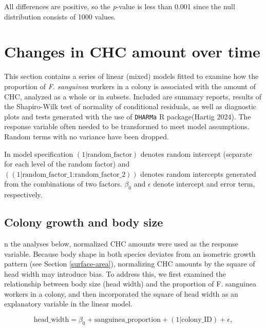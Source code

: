 \documentclass[
]{article}
\begin{document}
All differences are positive, so the \emph{p}-value is less than 0.001 since the null distribution consists of 1000 values.

\section{Changes in CHC amount over time}\label{changes-in-chc-amount-over-time}

This section contains a series of linear (mixed) models fitted to examine how the proportion of \emph{F. sanguinea} workers in a colony is associated with the amount of CHC, analyzed as a whole or in subsets. Included are summary reports, results of the Shapiro-Wilk test of normality of conditional residuals, as well as diagnostic plots and tests generated with the use of \texttt{DHARMa} R package(Hartig 2024). The response variable often needed to be transformed to meet model assumptions. Random terms with no variance have been dropped.

In model specification \((1|\text{random_factor})\) denotes random intercept (separate for each level of the random factor) and \(((1|\text{random_factor_1:random_factor_2}))\) denotes random intercepts generated from the combinations of two factors. \(\beta_{0}\) and \(\epsilon\) denote intercept and error term, respectively.

\subsection{Colony growth and body size}\label{colony-growth-and-body-size}

n the analyses below, normalized CHC amounts were used as the response variable. Because body shape in both species deviates from an isometric growth pattern (see Section \ref{surface-area}), normalizing CHC amounts by the square of head width may introduce bias. To address this, we first examined the relationship between body size (head width) and the proportion of F. sanguinea workers in a colony, and then incorporated the square of head width as an explanatory variable in the linear model.

\[
\text{head_width} =  \beta_0 + \text{sanguinea_proportion} + (1|\text{colony_ID}) + \epsilon,
\]
\end{document}
